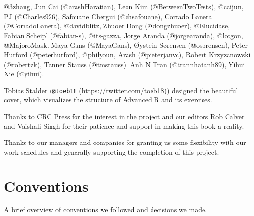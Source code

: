 \documentclass[
]{krantz}
\renewcommand{\href}[2]{#2 (\url{#1})}
\begin{document}
@3zhang, Jun Cai (@arashHaratian), Leon Kim (@BetweenTwoTests), @caijun, PJ (@Charles926), Safouane Chergui (@chsafouane), Corrado Lanera (@CorradoLanera), @davidblitz, Zhuoer Dong (@dongzhuoer), @Elucidase, Fabian Scheipl (@fabian-s), @its-gazza, Jorge Aranda (@jorgearanda), @lotgon, @MajoroMask, Maya Gans (@MayaGans), Øystein Sørensen (@osorensen), Peter Hurford (@peterhurford), @philyoun, Arash (@pieterjanvc), Robert Krzyzanowski (@robertzk), Tanner Stauss (@tmstauss), Anh N Tran (@trannhatanh89), Yihui Xie (@yihui).

Tobias Stalder (\href{https://twitter.com/toeb18}{\texttt{@toeb18}}) designed the beautiful cover, which visualizes the structure of Advanced R and its exercises.

Thanks to CRC Press for the interest in the project and our editors Rob Calver and Vaishali Singh for their patience and support in making this book a reality.

Thanks to our managers and companies for granting us some flexibility with our work schedules and generally supporting the completion of this project.

\hypertarget{conventions}{%
\section{Conventions}\label{conventions}}

A brief overview of conventions we followed and decisions we made.
\end{document}
